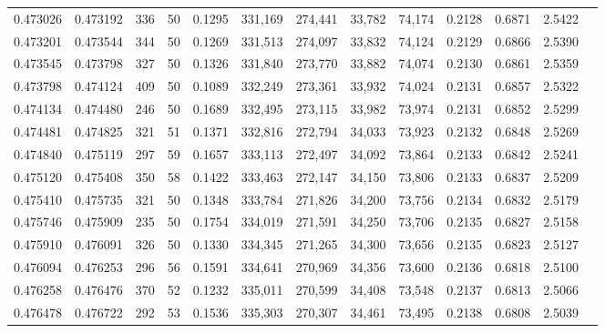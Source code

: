 \begin{tabular}{rrrrrrrrrrrrr}
0.473026 & 0.473192 &   336 &  50 &                                     0.1295 & 331,169 & 274,441 &  33,782 &  74,174 & 0.2128 & 0.6871 & 2.5422 \\
0.473201 & 0.473544 &   344 &  50 &                                     0.1269 & 331,513 & 274,097 &  33,832 &  74,124 & 0.2129 & 0.6866 & 2.5390 \\
0.473545 & 0.473798 &   327 &  50 &                                     0.1326 & 331,840 & 273,770 &  33,882 &  74,074 & 0.2130 & 0.6861 & 2.5359 \\
0.473798 & 0.474124 &   409 &  50 &                                     0.1089 & 332,249 & 273,361 &  33,932 &  74,024 & 0.2131 & 0.6857 & 2.5322 \\
0.474134 & 0.474480 &   246 &  50 &                                     0.1689 & 332,495 & 273,115 &  33,982 &  73,974 & 0.2131 & 0.6852 & 2.5299 \\
0.474481 & 0.474825 &   321 &  51 &                                     0.1371 & 332,816 & 272,794 &  34,033 &  73,923 & 0.2132 & 0.6848 & 2.5269 \\
0.474840 & 0.475119 &   297 &  59 &                                     0.1657 & 333,113 & 272,497 &  34,092 &  73,864 & 0.2133 & 0.6842 & 2.5241 \\
0.475120 & 0.475408 &   350 &  58 &                                     0.1422 & 333,463 & 272,147 &  34,150 &  73,806 & 0.2133 & 0.6837 & 2.5209 \\
0.475410 & 0.475735 &   321 &  50 &                                     0.1348 & 333,784 & 271,826 &  34,200 &  73,756 & 0.2134 & 0.6832 & 2.5179 \\
0.475746 & 0.475909 &   235 &  50 &                                     0.1754 & 334,019 & 271,591 &  34,250 &  73,706 & 0.2135 & 0.6827 & 2.5158 \\
0.475910 & 0.476091 &   326 &  50 &                                     0.1330 & 334,345 & 271,265 &  34,300 &  73,656 & 0.2135 & 0.6823 & 2.5127 \\
0.476094 & 0.476253 &   296 &  56 &                                     0.1591 & 334,641 & 270,969 &  34,356 &  73,600 & 0.2136 & 0.6818 & 2.5100 \\
0.476258 & 0.476476 &   370 &  52 &                                     0.1232 & 335,011 & 270,599 &  34,408 &  73,548 & 0.2137 & 0.6813 & 2.5066 \\
0.476478 & 0.476722 &   292 &  53 &                                     0.1536 & 335,303 & 270,307 &  34,461 &  73,495 & 0.2138 & 0.6808 & 2.5039 \\

\end{tabular}
